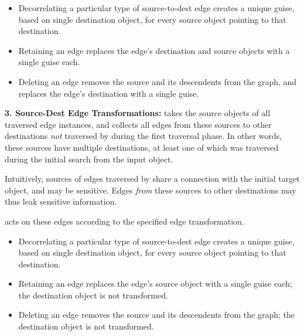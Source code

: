      \begin{itemize}
         \item Decorrelating a particular type of source-to-dest edge creates a unique guise, based
        on single destination object, for every source object pointing to that destination.

    \item Retaining an edge replaces the edge's destination and source objects with a single guise
        each.
        
    \item Deleting an edge removes the source and its descendents from the graph, and replaces the
        edge's destination with a single guise.
     \end{itemize}

    \vspace{0.5\baselineskip}\noindent\textbf{3. Source-Dest Edge Transformations:}
        \sys takes the source objects of all traversed edge instances, and collects all edges
        from these sources to other destinations \emph{not} traversed by \sys during the first
        traversal phase. In other words, these sources have multiple destinations, at least one of which
        was traversed during the initial search from the input object.

        Intuitively, sources of edges traversed by \sys share a connection with the initial
        target object, and may be sensitive. Edges \emph{from} these sources to other destinations may
        thus leak sensitive information.

        \sys acts on these edges according to the specified edge transformation.
     
         \begin{itemize}
             \item Decorrelating a particular type of source-to-dest edge creates a unique guise, based
                on single destination object, for every source object pointing to that destination.

            \item Retaining an edge replaces the edge's source object with a single guise
                each; the destination object is not transformed.
            
            \item Deleting an edge removes the source and its descendents from the graph; the
                destination object is not transformed.
         \end{itemize}

